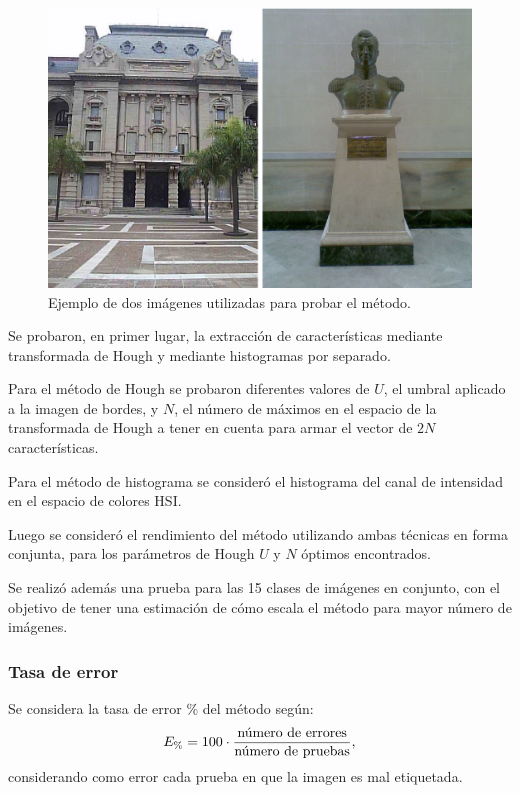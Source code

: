 \documentclass[conference,spanish,a4paper,10pt,oneside,final]{tfmpd}
\begin{document}
\begin{figure}
\begin{center}
\includegraphics[scale=0.25]{../diagramas/dibujo} 
\end{center}
\caption{Ejemplo de dos imágenes utilizadas para probar el método.}
\label{imagenes}
\end{figure}

Se probaron, en primer lugar, la extracción de características mediante
transformada de Hough y mediante histogramas por separado.

Para el método de Hough se probaron diferentes valores de $U$, el umbral
aplicado a la imagen de bordes, y $N$, el número de máximos en el espacio de
la transformada de Hough a tener en cuenta para armar el vector de $2N$
características.

Para el método de histograma se consideró el histograma del canal de
intensidad en el espacio de colores HSI.

Luego se consideró el rendimiento del método utilizando ambas técnicas en
forma conjunta, para los parámetros de Hough $U$ y $N$ óptimos encontrados.

Se realizó además una prueba para las 15 clases de imágenes en conjunto,
con el objetivo de tener una estimación de cómo escala el método para
mayor número de imágenes.

\subsubsection*{Tasa de error}
Se considera la tasa de error $\%$ del método según:
\begin{equation}
E_\%=100\cdot\frac{\textrm{número de errores}}{\textrm{número de pruebas}},
\end{equation}
considerando como error cada prueba en que la imagen es mal etiquetada.
\end{document}
